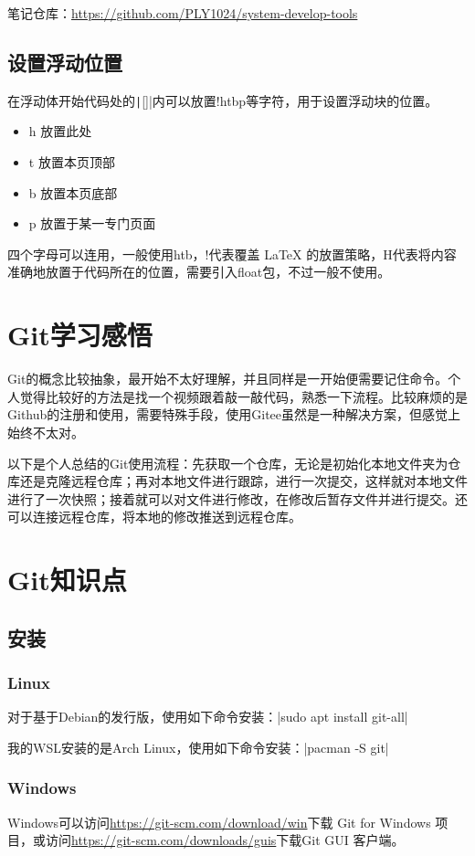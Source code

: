 \documentclass[fontset=ubuntu]{ctexart}
\begin{document}
笔记仓库：\url{https://github.com/PLY1024/system-develop-tools}

\subsection{设置浮动位置}
在浮动体开始代码处的\texttt|[]|内可以放置!htbp等字符，用于设置浮动块的位置。

\begin{itemize}
    \item h 放置此处
    \item t 放置本页顶部
    \item b 放置本页底部
    \item p 放置于某一专门页面
\end{itemize}

四个字母可以连用，一般使用htb，!代表覆盖 \LaTeX{} 的放置策略，H代表将内容准确地放置于代码所在的位置，需要引入float包，不过一般不使用。

\section{Git学习感悟}
Git的概念比较抽象，最开始不太好理解，并且同样是一开始便需要记住命令。个人觉得比较好的方法是找一个视频跟着敲一敲代码，熟悉一下流程。比较麻烦的是Github的注册和使用，需要特殊手段，使用Gitee虽然是一种解决方案，但感觉上始终不太对。

以下是个人总结的Git使用流程：先获取一个仓库，无论是初始化本地文件夹为仓库还是克隆远程仓库；再对本地文件进行跟踪，进行一次提交，这样就对本地文件进行了一次快照；接着就可以对文件进行修改，在修改后暂存文件并进行提交。还可以连接远程仓库，将本地的修改推送到远程仓库。

\section{Git知识点}
\subsection{安装}
\subsubsection{Linux}
对于基于Debian的发行版，使用如下命令安装：|sudo apt install git-all|

我的WSL安装的是Arch Linux，使用如下命令安装：|pacman -S git|

\subsubsection{Windows}
Windows可以访问\url{https://git-scm.com/download/win}下载 Git for Windows 项目，或访问\url{https://git-scm.com/downloads/guis}下载Git GUI 客户端。
\end{document}
